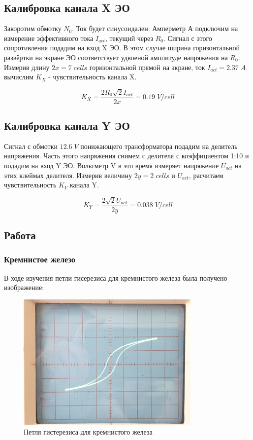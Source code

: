\documentclass{article}
\begin{document}
\subsection{Калибровка канала X ЭО}

Закоротим обмотку \(N_0\). Ток будет синусоидален. Амперметр А подключим на измерение эффективного тока \(I_{act}\),
текущий через \(R_0\). Сигнал с этого сопротивления подадим на вход X ЭО. В этом случае ширина горизонтальной
развёртки на экране ЭО соответствует удвоеной амплитуде напряжения на \(R_0\). Измерив длину \(2x = 7\; cells\)
горизонтальной прямой на экране, ток \(I_{act} = 2.37\; A\) вычислим \(K_X\) - чувствительность канала X.

\[ K_X = \frac{2R_0\sqrt{2}I_{act}}{2x} = 0.19\; V/cell\]

\subsection{Калибровка канала Y ЭО}

Сигнал с обмотки $12.6\; V$ понижающего трансформатора подадим на делитель напряжения. Часть этого напряжения снимем
с делителя с коэффициентом 1:10 и подадим  на вход Y ЭО. Вольтметр V в это время измеряет напряжение \(U_{act}\) на
этих клеймах делителя. Измерив величину \(2y = 2\; cells\) и \(U_{act}\), расчитаем чувствительность \(K_Y\) канала Y.

\[ K_Y = \frac{2\sqrt{2}U_{act}}{2y} = 0.038\; V/cell \]
\subsection{Работа}
\subsubsection{Кремнистое железо}
В ходе изучения петли гисерезиса для кремнистого железа была получено изображение:
\begin{figure}[H]
    \centering
    \includegraphics[width = 0.8\textwidth]{1-1.jpg}
    \caption{Петля гистерезиса для кремнистого железа}
\end{figure}
\end{document}
